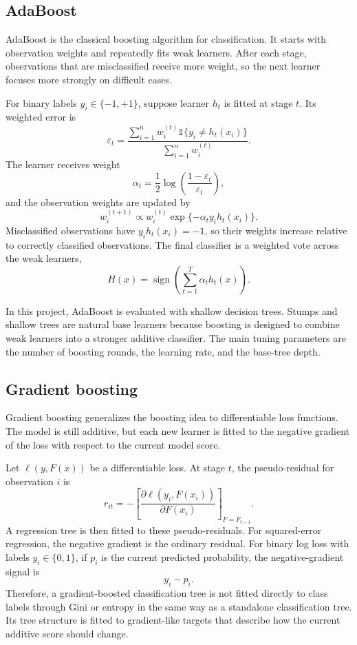 \subsection{AdaBoost}

AdaBoost is the classical boosting algorithm for classification. It starts with observation weights and repeatedly fits weak learners. After each stage, observations that are misclassified receive more weight, so the next learner focuses more strongly on difficult cases.

For binary labels \(y_i\in\{-1,+1\}\), suppose learner \(h_t\) is fitted at stage \(t\). Its weighted error is
\[
\varepsilon_t
=
\frac{\sum_{i=1}^{n} w_i^{(t)}\mathbb{1}\{y_i\neq h_t(x_i)\}}
{\sum_{i=1}^{n} w_i^{(t)}}.
\]
The learner receives weight
\[
\alpha_t
=
\frac{1}{2}\log\left(\frac{1-\varepsilon_t}{\varepsilon_t}\right),
\]
and the observation weights are updated by
\[
w_i^{(t+1)}
\propto
w_i^{(t)}\exp\{-\alpha_t y_i h_t(x_i)\}.
\]
Misclassified observations have \(y_i h_t(x_i)=-1\), so their weights increase relative to correctly classified observations. The final classifier is a weighted vote across the weak learners,
\[
H(x)=\operatorname{sign}\left(\sum_{t=1}^{T}\alpha_t h_t(x)\right).
\]

In this project, AdaBoost is evaluated with shallow decision trees. Stumps and shallow trees are natural base learners because boosting is designed to combine weak learners into a stronger additive classifier. The main tuning parameters are the number of boosting rounds, the learning rate, and the base-tree depth.

\subsection{Gradient boosting}

Gradient boosting generalizes the boosting idea to differentiable loss functions. The model is still additive, but each new learner is fitted to the negative gradient of the loss with respect to the current model score.

Let \(\ell(y,F(x))\) be a differentiable loss. At stage \(t\), the pseudo-residual for observation \(i\) is
\[
r_{it}
=
-
\left[
\frac{\partial \ell(y_i,F(x_i))}{\partial F(x_i)}
\right]_{F=F_{t-1}}.
\]
A regression tree is then fitted to these pseudo-residuals. For squared-error regression, the negative gradient is the ordinary residual. For binary log loss with labels \(y_i\in\{0,1\}\), if \(p_i\) is the current predicted probability, the negative-gradient signal is
\[
y_i-p_i.
\]
Therefore, a gradient-boosted classification tree is not fitted directly to class labels through Gini or entropy in the same way as a standalone classification tree. Its tree structure is fitted to gradient-like targets that describe how the current additive score should change.

